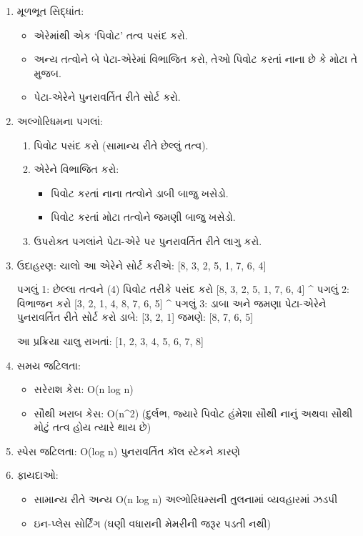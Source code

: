 \begin{enumerate}
\def\labelenumi{\arabic{enumi}.}
\item
  મૂળભૂત સિદ્ધાંત:

  \begin{itemize}
  \tightlist
  \item
    એરેમાંથી એક `પિવોટ' તત્વ પસંદ કરો.
  \item
    અન્ય તત્વોને બે પેટા-એરેમાં વિભાજિત કરો, તેઓ પિવોટ કરતાં નાના છે કે મોટા તે મુજબ.
  \item
    પેટા-એરેને પુનરાવર્તિત રીતે સોર્ટ કરો.
  \end{itemize}
\item
  અલ્ગોરિધમના પગલાં:

  \begin{enumerate}
  \def\labelenumii{\alph{enumii}.}
  \tightlist
  \item
    પિવોટ પસંદ કરો (સામાન્ય રીતે છેલ્લું તત્વ).
  \item
    એરેને વિભાજિત કરો:

    \begin{itemize}
    \tightlist
    \item
      પિવોટ કરતાં નાના તત્વોને ડાબી બાજુ ખસેડો.
    \item
      પિવોટ કરતાં મોટા તત્વોને જમણી બાજુ ખસેડો.
    \end{itemize}
  \item
    ઉપરોક્ત પગલાંને પેટા-એરે પર પુનરાવર્તિત રીતે લાગુ કરો.
  \end{enumerate}
\item
  ઉદાહરણ: ચાલો આ એરેને સોર્ટ કરીએ: {[}8, 3, 2, 5, 1, 7, 6, 4{]}

  પગલું 1: છેલ્લા તત્વને (4) પિવોટ તરીકે પસંદ કરો {[}8, 3, 2, 5, 1, 7, 6, 4{]}
  \^{} પગલું 2: વિભાજન કરો {[}3, 2, 1, 4, 8, 7, 6, 5{]} \^{} પગલું 3: ડાબા
  અને જમણા પેટા-એરેને પુનરાવર્તિત રીતે સોર્ટ કરો ડાબે: {[}3, 2, 1{]} જમણે: {[}8,
  7, 6, 5{]}

  આ પ્રક્રિયા ચાલુ રાખતાં: {[}1, 2, 3, 4, 5, 6, 7, 8{]}
\item
  સમય જટિલતા:

  \begin{itemize}
  \tightlist
  \item
    સરેરાશ કેસ: O(n log n)
  \item
    સૌથી ખરાબ કેસ: O(n\^{}2) (દુર્લભ, જ્યારે પિવોટ હંમેશા સૌથી નાનું અથવા સૌથી
    મોટું તત્વ હોય ત્યારે થાય છે)
  \end{itemize}
\item
  સ્પેસ જટિલતા: O(log n) પુનરાવર્તિત કૉલ સ્ટેકને કારણે
\item
  ફાયદાઓ:

  \begin{itemize}
  \tightlist
  \item
    સામાન્ય રીતે અન્ય O(n log n) અલ્ગોરિધમ્સની તુલનામાં વ્યવહારમાં ઝડપી
  \item
    ઇન-પ્લેસ સોર્ટિંગ (ઘણી વધારાની મેમરીની જરૂર પડતી નથી)
  \end{itemize}
\end{enumerate}

